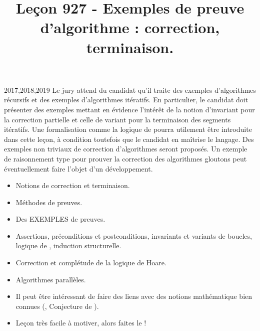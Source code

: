 \documentclass{agregfiche}
\title{Leçon 927 - Exemples de preuve d’algorithme :  correction, terminaison.}
\begin{document}
\maketitle

\secrapports
\begin{rapport}{2017,2018,2019}
    Le jury attend du candidat qu’il traite des exemples d’algorithmes récursifs et des exemples d’algorithmes itératifs.
    En particulier, le candidat doit présenter des exemples mettant en évidence l’intérêt de la notion
    d’invariant pour la correction partielle et celle de variant pour la terminaison des segments itératifs.
    Une formalisation comme la logique de  pourra utilement être introduite dans cette leçon, à
    condition toutefois que le candidat en maîtrise le langage. Des exemples non triviaux de correction
    d’algorithmes seront proposés. Un exemple de raisonnement type pour prouver la correction des algorithmes gloutons peut éventuellement faire l’objet d’un développement.
\end{rapport}

\secindispensables

\begin{itemize}
	\item Notions de correction et terminaison.
    \item Méthodes de preuves.
    \item Des EXEMPLES de preuves.
\end{itemize}

\secasavoir

\begin{itemize}
	\item Assertions, préconditions et
    postconditions, invariants et variants de boucles, logique de , induction structurelle.
\end{itemize}

\secidees

\begin{itemize}
    \item Correction et complétude de la logique de Hoare.
    \item Algorithmes parallèles.
\end{itemize}

\secpieges

\begin{itemize}
     \item Il peut être intéressant de faire des liens avec des
       notions mathématique bien connues (, Conjecture de
       ).
     \item Leçon très facile à motiver, alors faites le !
\end{itemize}
\end{document}
